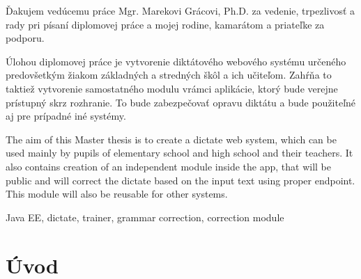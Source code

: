 \documentclass[12pt,oneside]{fithesis2}
\begin{document}
  \FrontMatter                    %
    \ThesisTitlePage                %
    \begin{ThesisDeclaration}       %
      \DeclarationText
      \AdvisorName
    \end{ThesisDeclaration}
    \begin{ThesisThanks}            %
      Ďakujem vedúcemu práce Mgr. Marekovi Grácovi, Ph.D. za vedenie, trpezlivosť a rady pri písaní diplomovej práce a mojej rodine, kamarátom a priateľke za podporu.
    \end{ThesisThanks}
    \begin{ThesisAbstract}          %
      Úlohou diplomovej práce je vytvorenie diktátového webového systému určeného predovšetkým žiakom základných a stredných škôl a ich učiteľom. Zahŕňa to taktiež vytvorenie samostatného modulu vrámci aplikácie, ktorý bude verejne prístupný skrz rozhranie. To bude zabezpečovať opravu diktátu a bude použiteľné aj pre prípadné iné systémy.
    \end{ThesisAbstract}
    \begin{ThesisAbstracten}          %

      The aim of this Master thesis is to create a dictate web system, which can be used mainly by pupils of elementary school and high school and their teachers. It also contains creation of an independent module inside the app, that will be public and will correct the dictate based on the input text using proper endpoint. This module will also be reusable for other systems.
    \end{ThesisAbstracten}
    \begin{ThesisKeyWords}          %
      Java EE, dictate, trainer, grammar correction, correction module
    \end{ThesisKeyWords}
    \tableofcontents                %
  
  \MainMatter                     %
    \chapter{Úvod}          %
  
\end{document}
